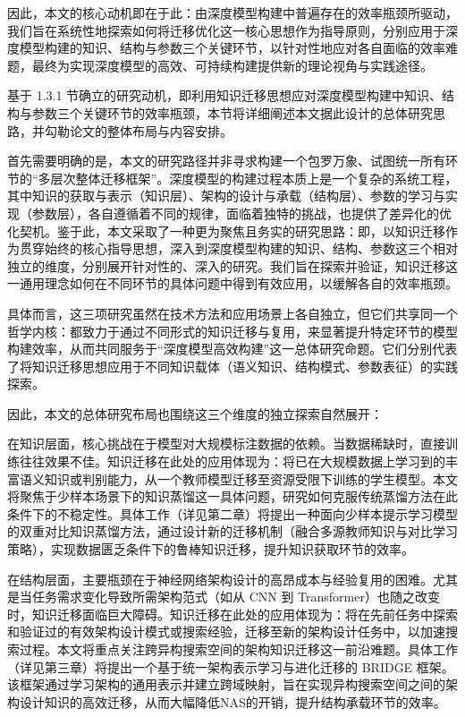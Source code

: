 \documentclass[../main.tex]{subfiles}
\begin{document}
因此，本文的核心动机即在于此：由深度模型构建中普遍存在的效率瓶颈所驱动，我们旨在系统性地探索如何将迁移优化这一核心思想作为指导原则，分别应用于深度模型构建的知识、结构与参数三个关键环节，以针对性地应对各自面临的效率难题，最终为实现深度模型的高效、可持续构建提供新的理论视角与实践途径。

\label{sec:ch1-3-2-research-idea-and-structure}

基于 1.3.1 节确立的研究动机，即利用知识迁移思想应对深度模型构建中知识、结构与参数三个关键环节的效率瓶颈，本节将详细阐述本文据此设计的总体研究思路，并勾勒论文的整体布局与内容安排。

首先需要明确的是，本文的研究路径并非寻求构建一个包罗万象、试图统一所有环节的“多层次整体迁移框架”。深度模型的构建过程本质上是一个复杂的系统工程，其中知识的获取与表示（知识层）、架构的设计与承载（结构层）、参数的学习与实现（参数层），各自遵循着不同的规律，面临着独特的挑战，也提供了差异化的优化契机。鉴于此，本文采取了一种更为聚焦且务实的研究思路：即，以知识迁移作为贯穿始终的核心指导思想，深入到深度模型构建的知识、结构、参数这三个相对独立的维度，分别展开针对性的、深入的研究。我们旨在探索并验证，知识迁移这一通用理念如何在不同环节的具体问题中得到有效应用，以缓解各自的效率瓶颈。

具体而言，这三项研究虽然在技术方法和应用场景上各自独立，但它们共享同一个哲学内核：都致力于通过不同形式的知识迁移与复用，来显著提升特定环节的模型构建效率，从而共同服务于“深度模型高效构建”这一总体研究命题。它们分别代表了将知识迁移思想应用于不同知识载体（语义知识、结构模式、参数表征）的实践探索。

因此，本文的总体研究布局也围绕这三个维度的独立探索自然展开：

在知识层面，核心挑战在于模型对大规模标注数据的依赖。当数据稀缺时，直接训练往往效果不佳。知识迁移在此处的应用体现为：将已在大规模数据上学习到的丰富语义知识或判别能力，从一个教师模型迁移至资源受限下训练的学生模型。本文将聚焦于少样本场景下的知识蒸馏这一具体问题，研究如何克服传统蒸馏方法在此条件下的不稳定性。具体工作（详见第二章）将提出一种面向少样本提示学习模型的双重对比知识蒸馏方法，通过设计新的迁移机制（融合多源教师知识与对比学习策略），实现数据匮乏条件下的鲁棒知识迁移，提升知识获取环节的效率。

在结构层面，主要瓶颈在于神经网络架构设计的高昂成本与经验复用的困难。尤其是当任务需求变化导致所需架构范式（如从 CNN 到 Transformer）也随之改变时，知识迁移面临巨大障碍。知识迁移在此处的应用体现为：将在先前任务中探索和验证过的有效架构设计模式或搜索经验，迁移至新的架构设计任务中，以加速搜索过程。本文将重点关注跨异构搜索空间的架构知识迁移这一前沿难题。具体工作（详见第三章）将提出一个基于统一架构表示学习与进化迁移的 BRIDGE 框架。该框架通过学习架构的通用表示并建立跨域映射，旨在实现异构搜索空间之间的架构设计知识的高效迁移，从而大幅降低NAS的开销，提升结构承载环节的效率。
\end{document}
